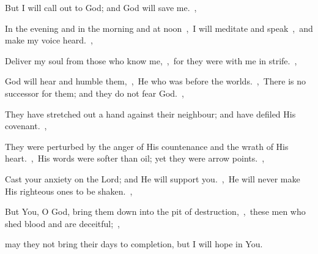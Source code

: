 \documentclass[12pt,twoside,a5paper]{article}
\begin{document}
\begin{normalparskip}
  But I will call out to God; and God will save me.~\sep

  In the evening and in the morning and at noon~\sep\ I will meditate and speak~\sep\ and make my voice heard.~\sep

  Deliver my soul from those who know me,~\sep\ for they were with me in strife.~\sep

  God will hear and humble them,~\sep\ He who was before the worlds.~\sep\ There is no successor for them; and they do not fear God.~\sep

  They have stretched out a hand against their neighbour; and have defiled His covenant.~\sep

  They were perturbed by the anger of His countenance and the wrath of His heart.~\sep\ His words were softer than oil; yet they were arrow points.~\sep

  Cast your anxiety on the Lord; and He will support you.~\sep\ He will never make His righteous ones to be shaken.~\sep

  But You, O God, bring them down into the pit of destruction,~\sep\ these men who shed blood and are deceitful;~\sep

  may they not bring their days to completion, but I will hope in You.
\end{normalparskip}



\end{document}
